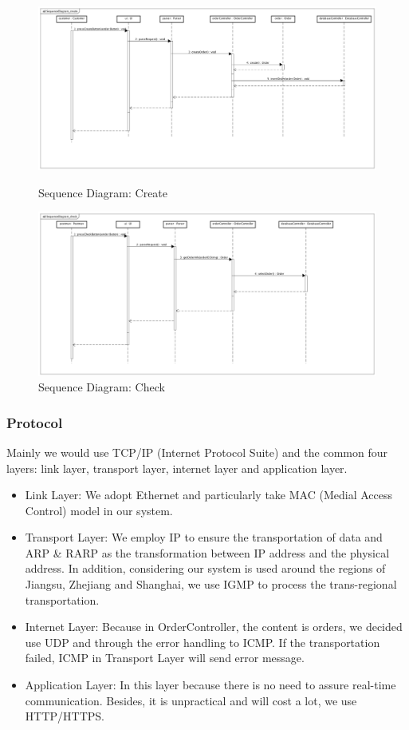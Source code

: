 \documentclass[12pt]{scrreprt}
\begin{document}
\begin{figure}[htbp]
	\centering\includegraphics[width=6in]{DocumentRes/1SequenceDiagram_create.png}
	\caption{Sequence Diagram: Create}
	\centering\includegraphics[width=6in]{DocumentRes/2SequenceDiagram_check.png}
	\caption{Sequence Diagram: Check}
\end{figure}
\subsubsection{Protocol}
Mainly we would use TCP/IP (Internet Protocol Suite) and the common four layers: link layer, transport layer, internet layer and application layer.\\
\begin{itemize}
	\item Link Layer: We adopt Ethernet and particularly take MAC (Medial Access Control) model in our system.
	\item Transport Layer: We employ IP to ensure the transportation of data and ARP \& RARP as the transformation between IP address and the physical address. In addition, considering our system is used around the regions of Jiangsu, Zhejiang and Shanghai, we use IGMP to process the trans-regional transportation.
	\item Internet Layer: Because in OrderController, the content is orders, we decided use UDP and through the error handling to ICMP. If the transportation failed, ICMP in Transport Layer will send error message.
	\item Application Layer: In this layer because there is no need to assure real-time communication. Besides, it is unpractical and will cost a lot, we use HTTP/HTTPS.	
\end{itemize}
\end{document}
